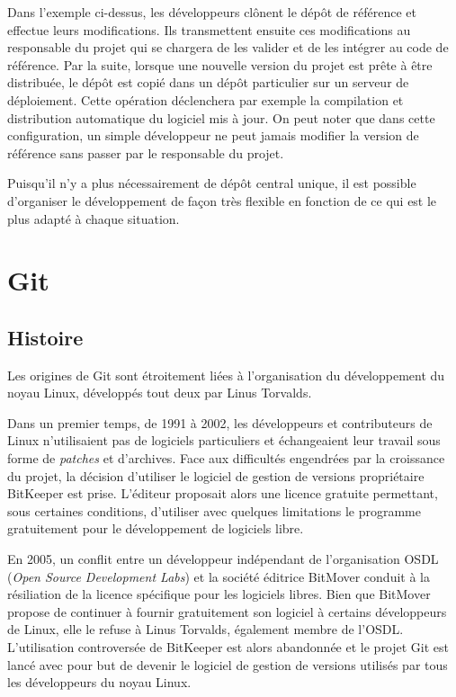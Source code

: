 \documentclass[11pt,a4paper]{article}
\begin{document}
Dans l'exemple ci-dessus, les développeurs clônent le dépôt de référence et effectue leurs modifications.
Ils transmettent ensuite ces modifications au responsable du projet qui se chargera de les valider et de les intégrer au code de référence.
Par la suite, lorsque une nouvelle version du projet est prête à être distribuée, le dépôt est copié dans un dépôt particulier sur un serveur de déploiement.
Cette opération déclenchera par exemple la compilation et distribution automatique du logiciel mis à jour.
On peut noter que dans cette configuration, un simple développeur ne peut jamais modifier la version de référence sans passer par le responsable du projet.

Puisqu'il n'y a plus nécessairement de dépôt central unique, il est possible d'organiser le développement de façon très flexible en fonction de ce qui est le plus adapté à chaque situation.


\section{Git}

\subsection{Histoire}

Les origines de Git sont étroitement liées à l'organisation du développement du noyau Linux, développés tout deux par Linus Torvalds.

Dans un premier temps, de 1991 à 2002, les développeurs et contributeurs de Linux n'utilisaient pas de logiciels particuliers et échangeaient leur travail sous forme de \textit{patches} et d'archives.
Face aux difficultés engendrées par la croissance du projet, la décision d'utiliser le logiciel de gestion de versions propriétaire BitKeeper est prise.
L'éditeur proposait alors une licence gratuite permettant, sous certaines conditions, d'utiliser avec quelques limitations le programme gratuitement pour le développement de logiciels libre.

En 2005, un conflit entre un développeur indépendant de l'organisation OSDL (\textit{Open Source Development Labs}) et la société éditrice BitMover conduit à la résiliation de la licence spécifique pour les logiciels libres.
Bien que BitMover propose de continuer à fournir gratuitement son logiciel à certains développeurs de Linux, elle le refuse à Linus Torvalds, également membre de l'OSDL.
L'utilisation controversée de BitKeeper est alors abandonnée et le projet Git est lancé avec pour but de devenir le logiciel de gestion de versions utilisés par tous les développeurs du noyau Linux.
\end{document}
